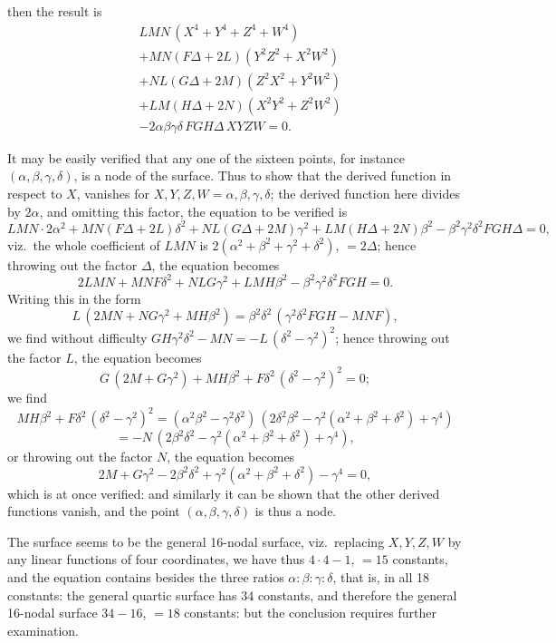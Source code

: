 \documentclass[11pt,a4paper]{article}
\begin{document}
\newpage


\noindent then the result is
\[
\begin{aligned}
& LMN\,(X^{4} + Y^{4} + Z^{4} + W^{4})\\
& + MN(F\Delta + 2L)(Y^{2}Z^{2} + X^{2}W^{2})\\
& + NL(G\Delta + 2M)(Z^{2}X^{2} + Y^{2}W^{2})\\
& + LM(H\Delta + 2N)(X^{2}Y^{2} + Z^{2}W^{2})\\
& - 2\alpha\beta\gamma\delta\,FGH\Delta\,XYZW = 0.
\end{aligned}
\]

It may be easily verified that any one of the sixteen points, for instance $(\alpha, \beta, \gamma, \delta)$, is a node of the surface. Thus to show that the derived function in respect to $X$, vanishes for $X, Y, Z, W = \alpha, \beta, \gamma, \delta$; the derived function here divides by $2\alpha$, and omitting this factor, the equation to be verified is
\[
LMN\cdot 2\alpha^{2} + MN(F\Delta + 2L)\delta^{2} + NL(G\Delta + 2M)\gamma^{2} + LM(H\Delta + 2N)\beta^{2} - \beta^{2}\gamma^{2}\delta^{2}FGH\Delta = 0,
\]
viz.\ the whole coefficient of $LMN$ is $2(\alpha^{2} + \beta^{2} + \gamma^{2} + \delta^{2})$, $= 2\Delta$; hence throwing out the factor $\Delta$, the equation becomes
\[
2LMN + MNF\delta^{2} + NLG\gamma^{2} + LMH\beta^{2} - \beta^{2}\gamma^{2}\delta^{2}FGH = 0.
\]
Writing this in the form
\[
L\,(2MN + NG\gamma^{2} + MH\beta^{2}) = \beta^{2}\delta^{2}\,(\gamma^{2}\delta^{2}FGH - MNF),
\]
we find without difficulty $GH\gamma^{2}\delta^{2} - MN = -L\,(\delta^{2} - \gamma^{2})^{2}$; hence throwing out the factor $L$, the equation becomes
\[
G\,(2M + G\gamma^{2}) + MH\beta^{2} + F\delta^{2}\,(\delta^{2} - \gamma^{2})^{2} = 0;
\]
we find
\[
MH\beta^{2} + F\delta^{2}\,(\delta^{2} - \gamma^{2})^{2} = (\alpha^{2}\beta^{2} - \gamma^{2}\delta^{2})\,(2\delta^{2}\beta^{2} - \gamma^{2}(\alpha^{2} + \beta^{2} + \delta^{2}) + \gamma^{4})
\]
\[
= -N\,(2\beta^{2}\delta^{2} - \gamma^{2}(\alpha^{2} + \beta^{2} + \delta^{2}) + \gamma^{4}),
\]
or throwing out the factor $N$, the equation becomes
\[
2M + G\gamma^{2} - 2\beta^{2}\delta^{2} + \gamma^{2}(\alpha^{2} + \beta^{2} + \delta^{2}) - \gamma^{4} = 0,
\]
which is at once verified: and similarly it can be shown that the other derived functions vanish, and the point $(\alpha, \beta, \gamma, \delta)$ is thus a node.

\medskip

The surface seems to be the general 16-nodal surface, viz.\ replacing $X, Y, Z, W$ by any linear functions of four coordinates, we have thus $4 \cdot 4 - 1$, $= 15$ constants, and the equation contains besides the three ratios $\alpha : \beta : \gamma : \delta$, that is, in all 18 constants: the general quartic surface has 34 constants, and therefore the general 16-nodal surface $34 - 16$, $= 18$ constants: but the conclusion requires further examination.
\end{document}
